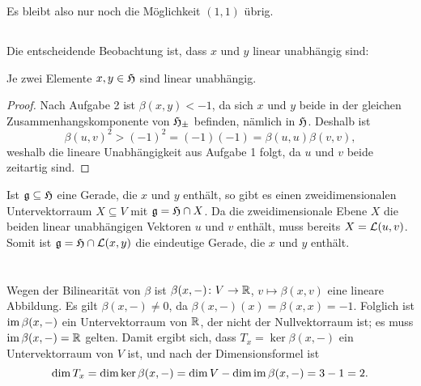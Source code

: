 \documentclass[a4paper,10pt,numbers=noenddot]{scrartcl}
\begin{document}
Es bleibt also nur noch die Möglichkeit $(1,1)$ übrig.





\subsection{}

Die entscheidende Beobachtung ist, dass $x$ und $y$ linear unabhängig sind:


\begin{lemma}\label{lem: elements of hyperbolic space are linear independent}
  Je zwei Elemente $x, y \in \mathfrak{H}$ sind linear unabhängig.
\end{lemma}
\begin{proof}
Nach Aufgabe 2 ist $\beta(x,y) < -1$, da sich $x$ und $y$ beide in der gleichen Zusammenhangskomponente von $\mathfrak{H}_{\pm}$ befinden, nämlich in $\mathfrak{H}$.
Deshalb ist
\[
    \beta(u,v)^2
  > (-1)^2
  = (-1)(-1)
  = \beta(u,u)\beta(v,v),
\]
weshalb die lineare Unabhängigkeit aus Aufgabe 1 folgt, da $u$ und $v$ beide zeitartig sind.
\end{proof}

Ist $\mathfrak{g} \subseteq \mathfrak{H}$ eine Gerade, die $x$ und $y$ enthält, so gibt es einen zweidimensionalen Untervektorraum $X \subseteq V$ mit $\mathfrak{g} = \mathfrak{H} \cap X$.
Da die zweidimensionale Ebene $X$ die beiden linear unabhängigen Vektoren $u$ und $v$ enthält, muss bereits $X = \operatorname{\mathcal{L}}(u,v)$.
Somit ist $\mathfrak{g} = \mathfrak{H} \cap \operatorname{\mathcal{L}}(x,y)$ die eindeutige Gerade, die $x$ und $y$ enthält.










\section{}





\subsection{}


Wegen der Bilinearität von $\beta$ ist $\beta(x, -) \colon V \to \mathbb{R}$, $v \mapsto \beta(x,v)$ eine lineare Abbildung.
Es gilt $\beta(x, -) \neq 0$, da $\beta(x,-)(x) = \beta(x,x) = -1$.
Folglich ist $\operatorname{im} \beta(x, -)$ ein Untervektorraum von $\mathbb{R}$, der nicht der Nullvektorraum ist; es muss $\operatorname{im} \beta(x, -) = \mathbb{R}$ gelten.
Damit ergibt sich, dass $T_x = \ker \beta(x, -)$ ein Untervektorraum von $V$ ist, und nach der Dimensionsformel ist
\[
    \dim T_x
  = \dim \ker \beta(x,-)
  = \dim V - \dim \operatorname{im} \beta(x, -)
  = 3 - 1
  = 2.
\]
\end{document}
